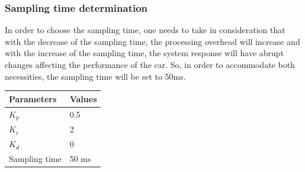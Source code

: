 \subsubsection{Sampling time determination}
In order to choose the sampling time, one needs to take in consideration that with the decrease of the sampling time, the processing overhead will increase and with the increase of the sampling time, the system response will have abrupt changes affecting the performance of the car. So, in order to accommodate both necessities, the sampling time will be set to 50ms.
\begin{table}[]
\begin{tabular}{|l|l|}
\hline
\rowcolor[HTML]{FFFFFF} 
Parameters    & Values \\ \hline
$K_p$         & 0.5    \\ \hline
\rowcolor[HTML]{FFFFFF} 
$K_i$         & 2      \\ \hline
\rowcolor[HTML]{FFFFFF} 
$K_d$         & 0      \\ \hline
\rowcolor[HTML]{FFFFFF} 
Sampling time & 50 ms  \\ \hline
\end{tabular}
\end{table}
